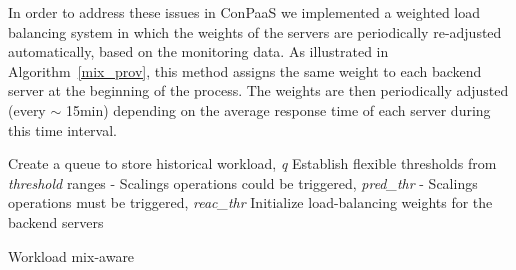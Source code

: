 In order to address these issues in ConPaaS we implemented a weighted load balancing
system in which the weights of the servers are periodically re-adjusted
automatically, based on the monitoring data. As illustrated in 
Algorithm~\ref{mix_prov}, this method assigns the same weight to each 
backend server at the beginning of the process. The weights are then periodically
adjusted (every $\sim$ 15min) depending on the average response time
of each server during this time interval.


\begin{algorithm}
{\scriptsize
\SetAlgoLined
\SetInd{0mm}{2mm}
\BlankLine
Create a queue to store historical workload, \emph{q}\;
Establish flexible thresholds from \emph{threshold} ranges\;
\hspace{3mm}	- Scalings operations could be triggered, \emph{pred\_thr}\;
\hspace{3mm}	- Scalings operations must be triggered, \emph{reac\_thr}\; 
Initialize load-balancing weights for the backend servers\;
\BlankLine
{}
}
\caption{Workload mix-aware}
\label{mix_prov}
\end{algorithm}



